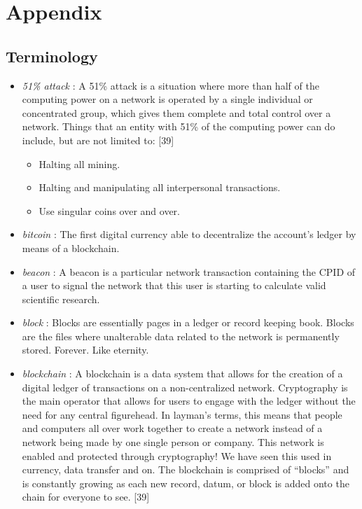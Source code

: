 \section{Appendix}

\subsection{Terminology}

\begin{itemize}
  \item \textit{51\% attack} : A 51\% attack is a situation where more than half of the computing power on a network is operated by a single individual or concentrated group, which   gives them complete and total control over a network. Things that an entity with 51\% of the computing power can do include, but are not limited to: [39]\\
  \begin{itemize}
	\item Halting all mining.
	\item Halting and manipulating all interpersonal transactions.
	\item Use singular coins over and over.
  \end{itemize}
  \item \textit{bitcoin} : The first digital currency able to decentralize the account's ledger by means of a blockchain. 
  \item \textit{beacon} : A beacon is a particular network transaction containing the CPID of a user to signal the network that this user is starting to calculate valid scientific research.
  \item \textit{block} : Blocks are essentially pages in a ledger or record keeping book. Blocks are the files where unalterable data related to the network is permanently stored. Forever. Like eternity.
  \item \textit{blockchain} : A blockchain is a data system that allows for the creation of a digital ledger of transactions on a non-centralized network. Cryptography is the main operator that allows for users to engage with the ledger without the need for any central figurehead. In layman’s terms, this means that people and computers all over work together to create a network instead of a network being made by one single person or company. This network is enabled and protected through cryptography! We have seen this used in currency, data transfer and on. The blockchain is comprised of “blocks” and is constantly growing as each new record, datum, or block is added onto the chain for everyone to see. [39]

\end{itemize}
